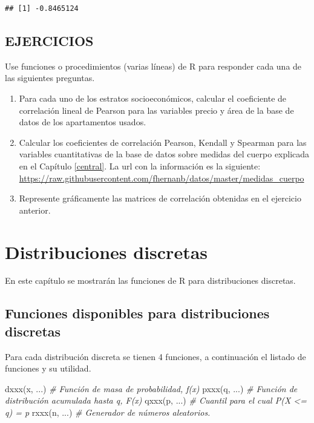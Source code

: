 \documentclass[
]{book}
\makeatletter
\newenvironment{Shaded}{\begin{snugshade}}{\end{snugshade}}
\newcommand{\CommentTok}[1]{\textcolor[rgb]{0.56,0.35,0.01}{\textit{#1}}}
\newcommand{\FunctionTok}[1]{\textcolor[rgb]{0.00,0.00,0.00}{#1}}
\newcommand{\NormalTok}[1]{#1}
\newenvironment{kframe}{%
\medskip{}
\setlength{\fboxsep}{.8em}
 \def\at@end@of@kframe{}%
 \ifinner\ifhmode%
  \def\at@end@of@kframe{\end{minipage}}%
  \begin{minipage}{\columnwidth}%
 \fi\fi%
 \def\FrameCommand##1{\hskip\@totalleftmargin \hskip-\fboxsep
 \colorbox{shadecolor}{##1}\hskip-\fboxsep
     \hskip-\linewidth \hskip-\@totalleftmargin \hskip\columnwidth}%
 \MakeFramed {\advance\hsize-\width
   \@totalleftmargin\z@ \linewidth\hsize
   \@setminipage}}%
 {\par\unskip\endMakeFramed%
 \at@end@of@kframe}
\renewenvironment{Shaded}{\begin{kframe}}{\end{kframe}}
\makeatother
\begin{document}
\begin{verbatim}
## [1] -0.8465124
\end{verbatim}

\hypertarget{ejercicios-5}{%
\section*{EJERCICIOS}\label{ejercicios-5}}

Use funciones o procedimientos (varias líneas) de R para responder cada una de las siguientes preguntas.

\begin{enumerate}
\def\labelenumi{\arabic{enumi}.}
\item
  Para cada uno de los estratos socioeconómicos, calcular el coeficiente de correlación lineal de Pearson para las variables precio y área de la base de datos de los apartamentos usados.
\item
  Calcular los coeficientes de correlación Pearson, Kendall y Spearman para las variables cuantitativas de la base de datos sobre medidas del cuerpo explicada en el Capítulo \ref{central}. La url con la información es la siguiente: \url{https://raw.githubusercontent.com/fhernanb/datos/master/medidas_cuerpo}
\item
  Represente gráficamente las matrices de correlación obtenidas en el ejercicio anterior.
\end{enumerate}

\hypertarget{discretas}{%
\chapter{Distribuciones discretas}\label{discretas}}

En este capítulo se mostrarán las funciones de R para distribuciones discretas.

\hypertarget{funciones-disponibles-para-distribuciones-discretas}{%
\section{\texorpdfstring{Funciones disponibles para distribuciones discretas }{Funciones disponibles para distribuciones discretas }}\label{funciones-disponibles-para-distribuciones-discretas}}

Para cada distribución discreta se tienen 4 funciones, a continuación el listado de funciones y su utilidad.

\begin{Shaded}
\begin{Highlighting}[]
\FunctionTok{dxxx}\NormalTok{(x, ...)  }\CommentTok{\# Función de masa de probabilidad, f(x)}
\FunctionTok{pxxx}\NormalTok{(q, ...)  }\CommentTok{\# Función de distribución acumulada hasta q, F(x)}
\FunctionTok{qxxx}\NormalTok{(p, ...)  }\CommentTok{\# Cuantil para el cual P(X \textless{}= q) = p}
\FunctionTok{rxxx}\NormalTok{(n, ...)  }\CommentTok{\# Generador de números aleatorios.}
\end{Highlighting}
\end{Shaded}
\end{document}
